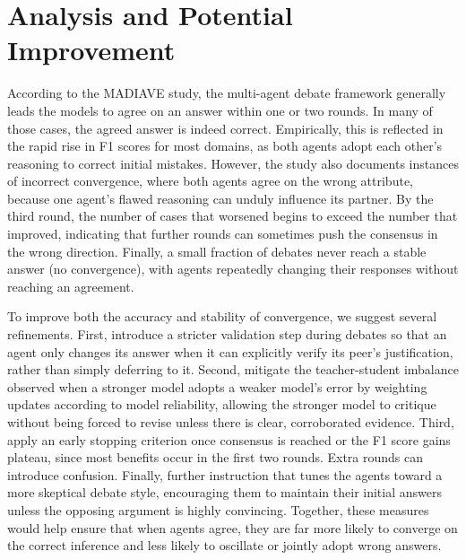 \documentclass[11pt]{article}
\newcommand{\modelname}{MADIAVE}
\begin{document}
\section{Analysis and Potential Improvement}
\label{sec:appendix2}
According to the \textsc{\modelname} study, the multi-agent debate framework generally leads the models to agree on an answer within one or two rounds. In many of those cases, the agreed answer is indeed correct. Empirically, this is reflected in the rapid rise in F1 scores for most domains, as both agents adopt each other’s reasoning to correct initial mistakes. However, the study also documents instances of incorrect convergence, where both agents agree on the wrong attribute, because one agent’s flawed reasoning can unduly influence its partner. By the third round, the number of cases that worsened begins to exceed the number that improved, indicating that further rounds can sometimes push the consensus in the wrong direction. Finally, a small fraction of debates never reach a stable answer (no convergence), with agents repeatedly changing their responses without reaching an agreement.

To improve both the accuracy and stability of convergence, we suggest several refinements. First, introduce a stricter validation step during debates so that an agent only changes its answer when it can explicitly verify its peer’s justification, rather than simply deferring to it. Second, mitigate the teacher-student imbalance observed when a stronger model adopts a weaker model’s error by weighting updates according to model reliability, allowing the stronger model to critique without being forced to revise unless there is clear, corroborated evidence. Third, apply an early stopping criterion once consensus is reached or the F1 score gains plateau, since most benefits occur in the first two rounds. Extra rounds can introduce confusion. Finally, further instruction that tunes the agents toward a more skeptical debate style, encouraging them to maintain their initial answers unless the opposing argument is highly convincing. Together, these measures would help ensure that when agents agree, they are far more likely to converge on the correct inference and less likely to oscillate or jointly adopt wrong answers.
\end{document}
